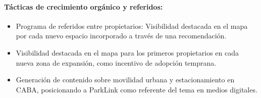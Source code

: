 \paragraph{Tácticas de crecimiento orgánico y referidos:}
\begin{itemize}
    \item Programa de referidos entre propietarios: Visibilidad destacada en el mapa por cada nuevo espacio incorporado a través de una recomendación.
    \item Visibilidad destacada en el mapa para los primeros propietarios en cada nueva zona de expansión, como incentivo de adopción temprana.
    \item Generación de contenido sobre movilidad urbana y estacionamiento en CABA, posicionando a ParkLink como referente del tema en medios digitales.
\end{itemize}
